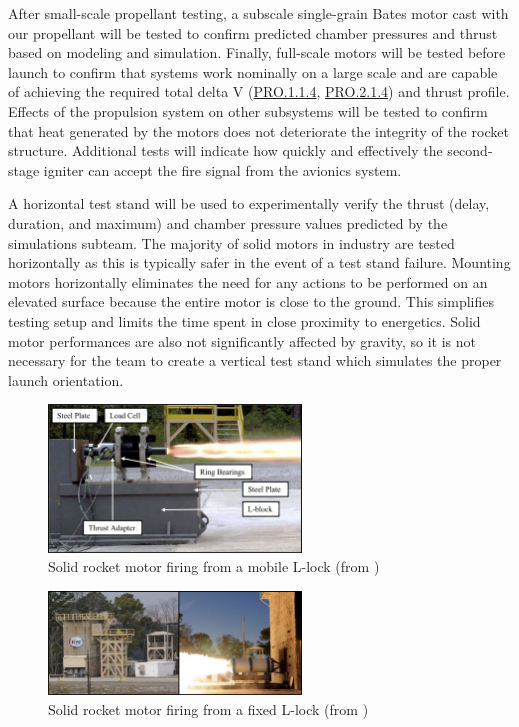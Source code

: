 After small-scale propellant testing, a subscale single-grain Bates motor cast with our propellant will be tested to confirm predicted chamber pressures and thrust based on modeling and simulation. Finally, full-scale motors will be tested before launch to confirm that systems work nominally on a large scale and are capable of achieving the required total delta V (\hyperlink{PRO.1.1.4}{PRO.1.1.4}, \hyperlink{PRO.2.1.4}{PRO.2.1.4}) and thrust profile. Effects of the propulsion system on other subsystems will be tested to confirm that heat generated by the motors does not deteriorate the integrity of the rocket structure. Additional tests will indicate how quickly and effectively the second-stage igniter can accept the fire signal from the avionics system.

A horizontal test stand will be used to experimentally verify the thrust (delay, duration, and maximum) and chamber pressure values predicted by the simulations subteam. The majority of solid motors in industry are tested horizontally as this is typically safer in the event of a test stand failure. Mounting motors horizontally eliminates the need for any actions to be performed on an elevated surface because the entire motor is close to the ground. This simplifies testing setup and limits the time spent in close proximity to energetics. Solid motor performances are also not significantly affected by gravity, so it is not necessary for the team to create a vertical test stand which simulates the proper launch orientation.

\begin{figure}
    \centering
    \includegraphics[width=0.6\textwidth]{images/srm-mobile-lblock}
    \caption{Solid rocket motor firing from a mobile L-lock (from \cite{uah-thesis})}
    \label{figure:lblock1}
\end{figure}

\begin{figure}
    \centering
    \includegraphics[width=0.6\textwidth]{images/srm-firing}
    \caption{Solid rocket motor firing from a fixed L-lock (from \cite{uah-thesis})}
    \label{figure:lblock2}
\end{figure}

